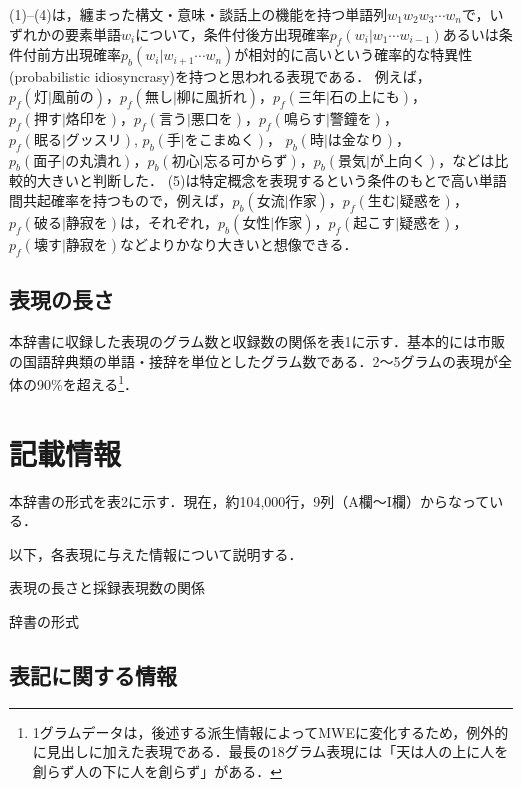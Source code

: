 \documentclass[japanese]{jnlp_1.4}
\begin{document}
(1)--(4)は，纏まった構文・意味・談話上の機能を持つ単語列$w_{1}w_{2}w_{3} \cdots w_{n}$で，いずれかの要素単語$w_{i}$について，条件付後方出現確率$p_{f}(w_{i}|w_{1}\cdots w_{i-1})$あるいは条件付前方出現確率$p_{b}(w_{i}|w_{i+1}\cdots w_{n})$が相対的に高いという確率的な特異性(probabilistic idiosyncrasy)を持つと思われる表現である．
例えば，$p_{f}(灯|風前の)$，$p_{f}(無し|柳に風折れ)$，$p_{f}(三年|石の上にも)$，
\linebreak
$p_{f}(押す|烙印を)$，$p_{f}(言う|悪口を)$，$p_{f}(鳴らす|警鐘を)$，$p_{f}(眠る|グッスリ)$, $p_{b}(手|をこまぬく)$， $p_{b}(時|は金なり)$，$p_{b}(面子|の丸潰れ)$，$p_{b}(初心|忘る可からず)$，$p_{b}(景気|が上向く)$，などは比較的大きいと判断した．
(5)は特定概念を表現するという条件のもとで高い単語間共起確率を持つもので，例えば，$p_{b}(女流|作家)$，$p_{f}(生む|疑惑を)$，$p_{f}(破る|静寂を)$は，それぞれ，$p_{b}(女性|作家)$，$p_{f}(起こす|疑惑を)$，$p_{f}(壊す|静寂を)$などよりかなり大きいと想像できる．


\subsection{表現の長さ}

本辞書に収録した表現のグラム数と収録数の関係を表1に示す．基本的には市販の国語辞典類の単語・接辞を単位としたグラム数である．2〜5グラムの表現が全体の90\%を超える\footnote{1グラムデータは，後述する派生情報によってMWEに変化するため，例外的に見出しに加えた表現である．最長の18グラム表現には「天は人の上に人を創らず人の下に人を創らず」がある．}．


\section{記載情報}

本辞書の形式を表2に示す．現在，約104,000行，9列（A欄〜I欄）からなっている．

以下，各表現に与えた情報について説明する．


\begin{table}[t]
\caption{表現の長さと採録表現数の関係}

\end{table}
\begin{table}[t]
\caption{辞書の形式}

\vspace{1\baselineskip}
\end{table}

\subsection{表記に関する情報}
\end{document}
